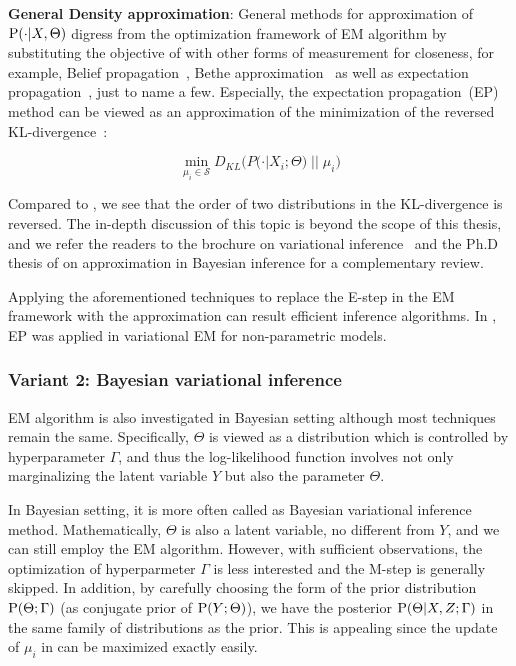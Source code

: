 \noindent \textbf{General Density approximation}: General methods for
approximation of $\P(\cdot | X, \Theta)$ digress from the optimization framework
of EM algorithm by substituting the objective of  with
other forms of measurement for closeness, for example, Belief
propagation~\cite{yedidia2005constructing}, Bethe
approximation~\cite{burgess1978bethe} as well as expectation
propagation~\cite{minka2001expectation}, just to name a few. Especially, the
expectation propagation~(EP) method can be viewed as an approximation of the
minimization of the reversed KL-divergence~\cite{minka2005divergence}:

\begin{equation}
\min\limits_{\mu_i \in \mathcal{S}} D_{KL}
\big(P(\cdot | X_i; \Theta) \; ||\;  \mu_i\big)\label{eq::em-alg-e-appro-rev}
\end{equation}

Compared  to , we see that
the order of two distributions in the KL-divergence is reversed. The in-depth
discussion of this topic is beyond the scope of this thesis, and we refer the
readers to the brochure on variational inference~\cite{wainwright2008graphical}
and the Ph.D thesis of \citet{minka2001family} on approximation in Bayesian
inference for a complementary review.

Applying the aforementioned techniques to replace the E-step in the EM framework
with the approximation can result efficient inference algorithms. In
\cite{wang2012truncation}, EP was applied in variational EM for non-parametric
models.

\subsubsection{Variant 2: Bayesian variational inference}

EM algorithm is also investigated in Bayesian setting although most techniques
remain the same. Specifically, $\Theta$ is viewed as a distribution which is
controlled by hyperparameter $\Gamma$, and thus the log-likelihood function
involves not only marginalizing the latent variable $Y$ but also the parameter
$\Theta$.

In Bayesian setting, it is more often called as Bayesian variational inference
method.  Mathematically, $\Theta$ is also a latent variable, no different from
$Y$, and we can still employ the EM algorithm. However, with sufficient
observations, the optimization of hyperparmeter $\Gamma$ is less interested and
the M-step is generally skipped. In addition, by carefully choosing the form of
the prior distribution $\P(\Theta ; \Gamma)$ (as conjugate prior of $\P(Y ;
\Theta)$), we have the posterior $\P(\Theta | X , Z ; \Gamma)$ in the same
family of distributions as the prior. This is appealing since the update of
$\mu_i$ in  can be maximized exactly easily.

